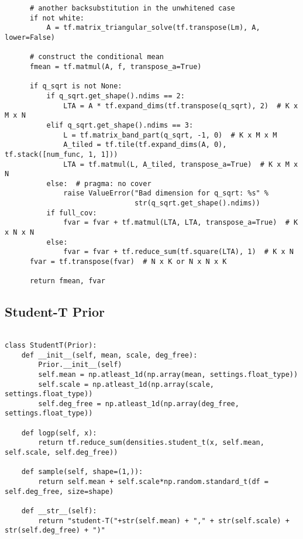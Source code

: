 \begin{verbatim}
      # another backsubstitution in the unwhitened case
      if not white:
          A = tf.matrix_triangular_solve(tf.transpose(Lm), A, lower=False)

      # construct the conditional mean
      fmean = tf.matmul(A, f, transpose_a=True)

      if q_sqrt is not None:
          if q_sqrt.get_shape().ndims == 2:
              LTA = A * tf.expand_dims(tf.transpose(q_sqrt), 2)  # K x M x N
          elif q_sqrt.get_shape().ndims == 3:
              L = tf.matrix_band_part(q_sqrt, -1, 0)  # K x M x M
              A_tiled = tf.tile(tf.expand_dims(A, 0), tf.stack([num_func, 1, 1]))
              LTA = tf.matmul(L, A_tiled, transpose_a=True)  # K x M x N
          else:  # pragma: no cover
              raise ValueError("Bad dimension for q_sqrt: %s" %
                               str(q_sqrt.get_shape().ndims))
          if full_cov:
              fvar = fvar + tf.matmul(LTA, LTA, transpose_a=True)  # K x N x N
          else:
              fvar = fvar + tf.reduce_sum(tf.square(LTA), 1)  # K x N
      fvar = tf.transpose(fvar)  # N x K or N x N x K

      return fmean, fvar
\end{verbatim}

\subsection{Student-T Prior}

\begin{verbatim}

class StudentT(Prior):
    def __init__(self, mean, scale, deg_free):
        Prior.__init__(self)
        self.mean = np.atleast_1d(np.array(mean, settings.float_type))
        self.scale = np.atleast_1d(np.array(scale, settings.float_type))
        self.deg_free = np.atleast_1d(np.array(deg_free, settings.float_type))

    def logp(self, x):
        return tf.reduce_sum(densities.student_t(x, self.mean, self.scale, self.deg_free))

    def sample(self, shape=(1,)):
        return self.mean + self.scale*np.random.standard_t(df = self.deg_free, size=shape)

    def __str__(self):
        return "student-T("+str(self.mean) + "," + str(self.scale) + str(self.deg_free) + ")"

\end{verbatim}
